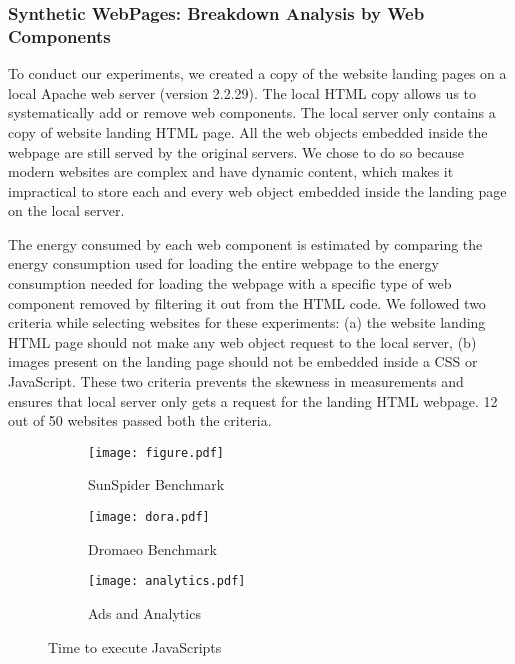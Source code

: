 \documentclass{sig-alternate-10pt}
\newlength\figwidth
\begin{document}
\subsubsection{Synthetic WebPages: Breakdown Analysis by Web Components}

To conduct our experiments, we created a copy of the website landing pages on a local Apache web server (version 2.2.29).  The local HTML copy  allows us to systematically add or remove web components. The local server only contains a copy of website landing HTML page. All the web objects embedded inside the webpage are still served by the original servers. We chose to do so because   modern websites are complex and have dynamic content, which makes it impractical to store each and every web object embedded inside the  landing page on the local server. 

The  energy consumed by  each web component is estimated by comparing   the energy consumption used for loading the entire webpage to the energy consumption needed for loading the webpage with a specific type of web component removed by filtering it out from the HTML code. We followed two criteria  while selecting websites for these experiments: (a) the website landing HTML page should not make any web object request to the local server, (b) images present on the landing page should not be embedded  inside a CSS or JavaScript. These two   criteria prevents the skewness in measurements and ensures that  local server only gets a  request for the landing  HTML webpage. 12 out of 50 websites passed both  the criteria.

\begin{figure*}[ht]
  \centering
     \begin{subfigure}{0.7\figwidth}

  \texttt{[image: figure.pdf]}
\caption{ SunSpider  Benchmark}
\label{fig-sunspider}
\end{subfigure}\begin{subfigure}{0.7\figwidth}

  \texttt{[image: dora.pdf]}
\caption{ Dromaeo  Benchmark}
\label{fig-dora}
\end{subfigure}\begin{subfigure}{0.7\figwidth}
  \texttt{[image: analytics.pdf]}
\caption{Ads and Analytics}
\label{fig-ads}
\end{subfigure}
\caption{Time to execute  JavaScripts}
    \label{fig-javascripts}
\end{figure*} 
\end{document}

